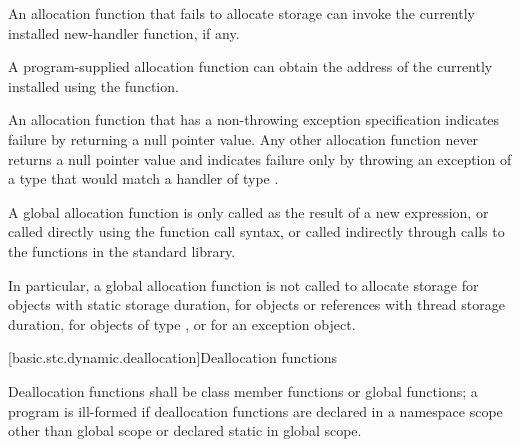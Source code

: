 \pnum
An allocation function that fails to allocate storage can invoke the
currently installed new-handler function, if any.
\begin{note}
%
A program-supplied allocation function can obtain the address of the
currently installed  using the
 function. \end{note}
An allocation function that has a non-throwing
exception specification
indicates failure by returning
a null pointer value.
Any other allocation function
never returns a null pointer value and
indicates failure only by throwing an exception of a type
that would match a handler of type
.

\pnum
A global allocation function is only called as the result of a new
expression, or called directly using the function call
syntax, or called indirectly through calls to the
functions in the \Cpp{} standard library. \begin{note} In particular, a
global allocation function is not called to allocate storage for objects
with static storage duration, for objects or references
with thread storage duration, for objects of
type , or for an
exception object.
\end{note}

[basic.stc.dynamic.deallocation]{Deallocation functions}

\pnum
{}%
Deallocation functions shall be class member functions or global
functions; a program is ill-formed if deallocation functions are
declared in a namespace scope other than global scope or declared static
in global scope.

